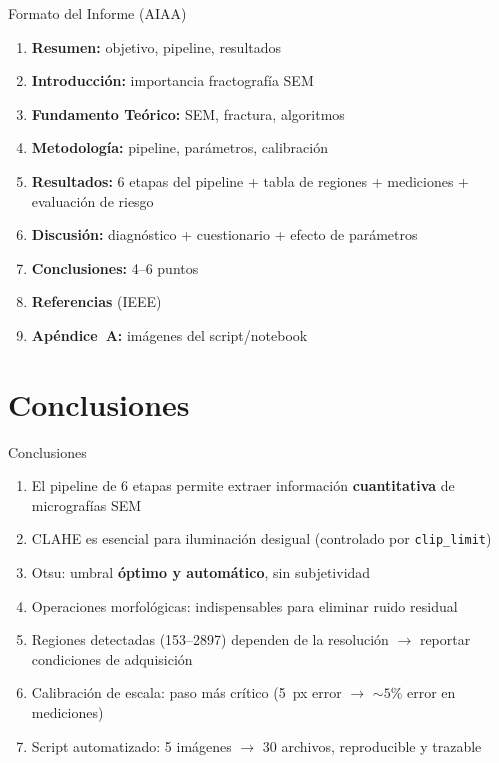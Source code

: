 \documentclass[aspectratio=169,12pt]{beamer}
\begin{document}
\begin{frame}{Formato del Informe (AIAA)}
	\begin{enumerate}
		\item \textbf{Resumen:} objetivo, pipeline, resultados
		\item \textbf{Introducción:} importancia fractografía SEM
		\item \textbf{Fundamento Teórico:} SEM, fractura, algoritmos
		\item \textbf{Metodología:} pipeline, parámetros, calibración
		\item \textbf{Resultados:} 6 etapas del pipeline + tabla de
		      regiones + mediciones + evaluación de riesgo
		\item \textbf{Discusión:} diagnóstico + cuestionario + efecto
		      de parámetros
		\item \textbf{Conclusiones:} 4--6 puntos
		\item \textbf{Referencias} (IEEE)
		\item \textbf{Apéndice~A:} imágenes del script/notebook
	\end{enumerate}
\end{frame}

\section{Conclusiones}

\begin{frame}{Conclusiones}
	\begin{enumerate}\small
		\item El pipeline de 6 etapas permite extraer información
		      \textbf{cuantitativa} de micrografías SEM
		\item CLAHE es esencial para iluminación desigual
		      (controlado por \texttt{clip\_limit})
		\item Otsu: umbral \textbf{óptimo y automático},
		      sin subjetividad
		\item Operaciones morfológicas: indispensables para
		      eliminar ruido residual
		\item Regiones detectadas (153--2897) dependen de la
		      resolución $\to$ reportar condiciones de adquisición
		\item Calibración de escala: paso más crítico
		      (5~px error $\to$ $\sim\!5\%$ error en mediciones)
		\item Script automatizado: 5 imágenes $\to$ 30 archivos,
		      reproducible y trazable
	\end{enumerate}
\end{frame}
\end{document}
